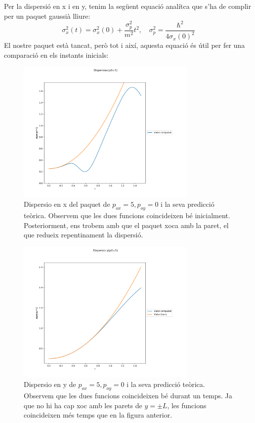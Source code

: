 \documentclass{article}
\begin{document}
Per la dispersió en x i en y, tenim la següent equació analítca que s'ha de complir per un paquet gaussià lliure:
\begin{equation}
\sigma_x^2(t)=\sigma_x^2(0)+\frac{\sigma_p^2}{m^2}t^2, \quad \sigma_p^2=\frac{\hbar^2}{4\sigma_x(0)^2}
\end{equation}
El nostre paquet està tancat, però tot i així, aquesta equació és útil per fer una comparació en els instants inicials:
\begin{figure}[H]
	\includegraphics[width=\textwidth,height=7cm]{dispersioxpo5.png}
	\caption{Dispersio en x del paquet de \(p_{ox}=5,p_{oy}=0\) i la seva predicció teòrica. Observem que les dues funcions coincideixen bé inicialment. Posteriorment, ens trobem amb que el paquet xoca amb la paret, el que redueix repentinament la dispersió.}
\end{figure}
\begin{figure}[H]
	\includegraphics[width=\textwidth,height=7cm]{dispersioypo05.png}
	\caption{ Dispersio en y de \(p_{ox}=5,p_{oy}=0\) i la seva predicció teòrica. Observem que les dues funcions coincideixen bé durant un temps. Ja que no hi ha cap xoc amb les parets de \(y=\pm L\), les funcions coincideixen més temps que en la figura anterior.}
\end{figure}
\end{document}
